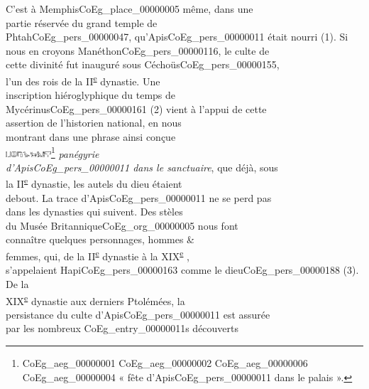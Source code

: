 \documentclass{book}
\begin{document}
{\begin{paracol}{2}
C’est à Memphis\gls{CoEg_place_00000005} même, dans une\\
partie réservée du grand temple de\\
Phtah\gls{CoEg_pers_00000047}, qu’Apis\gls{CoEg_pers_00000011} était nourri (1). Si\\
nous en croyons Manéthon\gls{CoEg_pers_00000116}, le culte de\\
cette divinité fut inauguré sous Céchoüs\gls{CoEg_pers_00000155},\\
l’un des rois de la II\textsuperscript{\underline{e}} dynastie. Une\\
inscription hiéroglyphique du temps de\\
Mycérinus\gls{CoEg_pers_00000161} (2) vient à l’appui de cette\\
assertion de l’historien national, en nous\\
montrant dans une phrase ainsi conçue\\
\includegraphics[height=6pt]{CoEg_Mariette_hiero_1857-04-01_4_2.png}\footnote{\foreignlanguage{translit}{\Gls{CoEg_aeg_00000001} \gls{CoEg_aeg_00000002} \gls{CoEg_aeg_00000006} \gls{CoEg_aeg_00000004}} « fête d’Apis\gls{CoEg_pers_00000011} dans le palais ».} \textit{panégyrie\\
d’Apis\gls{CoEg_pers_00000011} dans le sanctuaire}, que déjà, sous\\
la II\textsuperscript{\underline{e}} dynastie, les autels du dieu étaient\\
debout. La trace d’Apis\gls{CoEg_pers_00000011} ne se perd pas\\
dans les dynasties qui suivent. Des stèles\\
du Musée Britannique\gls{CoEg_org_00000005} nous font\\
connaître quelques personnages, hommes \&\\
femmes, qui, de la II\textsuperscript{\underline{e}} dynastie à la XIX\textsuperscript{\underline{e}} ,\\
s’appelaient Hapi\gls{CoEg_pers_00000163} comme le dieu\gls{CoEg_pers_00000188} (3). De la\\
XIX\textsuperscript{\underline{e}}  dynastie aux derniers Ptolémées, la\\
persistance du culte d’Apis\gls{CoEg_pers_00000011} est assurée\\
par les nombreux \glspl{CoEg_entry_00000011} découverts\\

\end{paracol}}
\end{document}
